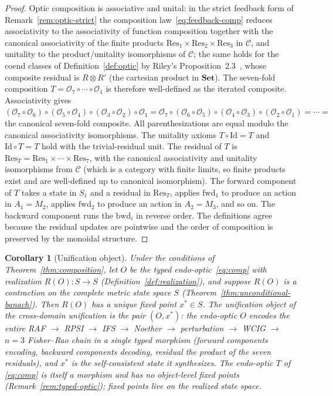 \documentclass[11pt,a4paper]{article}
\theoremstyle{plain}
\newtheorem{corollary}[theorem]{Corollary}
\theoremstyle{definition}
\theoremstyle{remark}
\newcommand{\OO}{\mathcal{O}}
\newcommand{\CC}{\mathcal{C}}
\begin{document}
\begin{proof}[Proof]
Optic composition is associative and unital: in the strict feedback
form of Remark~\ref{rem:optic-strict} the composition
law~\eqref{eq:feedback-comp} reduces associativity to the
associativity of function composition together with the canonical
associativity of the finite products
$\mathrm{Res}_1 \times \mathrm{Res}_2 \times \mathrm{Res}_3$ in
$\CC$, and unitality to the product/unitality isomorphisms of
$\CC$; the same holds for the coend classes of
Definition~\ref{def:optic} by Riley's
Proposition~2.3~\cite{riley2018optics}, whose composite residual is
$R \otimes R'$ (the cartesian product in $\mathbf{Set}$).
The seven-fold composition $T=\OO_7\circ\cdots\circ\OO_1$ is therefore
well-defined as the iterated composite. Associativity gives
$(\OO_7\circ\OO_6)\circ(\OO_5\circ\OO_4)\circ(\OO_3\circ\OO_2)\circ\OO_1
= \OO_7\circ(\OO_6\circ\OO_5)\circ(\OO_4\circ\OO_3)\circ(\OO_2\circ\OO_1)
= \cdots = $ the canonical seven-fold composite. All parenthesizations
are equal modulo the canonical associativity isomorphisms. The
unitality axioms $T\circ\mathrm{Id}=T$ and $\mathrm{Id}\circ T=T$
hold with the trivial-residual unit. The residual of $T$ is
$\mathrm{Res}_T=\mathrm{Res}_1\times\cdots\times\mathrm{Res}_7$, with
the canonical associativity and unitality isomorphisms from $\CC$
(which is a category with finite limits, so finite products exist and
are well-defined up to canonical isomorphism). The forward component of $T$ takes a state in
$S_1$ and a residual in $\mathrm{Res}_T$, applies $\mathrm{fwd}_1$ to
produce an action in $A_1 = M_2$, applies $\mathrm{fwd}_2$ to produce
an action in $A_2 = M_3$, and so on. The backward component runs the
$\mathrm{bwd}_i$ in reverse order. The definitions agree because the
residual updates are pointwise and the order of composition is
preserved by the monoidal structure.
\end{proof}

\begin{corollary}[Unification object]\label{cor:unification}
Under the conditions of Theorem~\ref{thm:composition}, let $O$ be the
typed endo-optic~\eqref{eq:comp} with realization $R(O) : S \to S$
(Definition~\ref{def:realization}), and suppose $R(O)$ is a
contraction on the complete metric state space $S$
(Theorem~\ref{thm:unconditional-banach}). Then $R(O)$ has a unique
fixed point $x^{*} \in S$. The \emph{unification object} of the
cross-domain unification is the pair $(O, x^{*})$: the endo-optic $O$
encodes the entire RAF $\to$ RPSI $\to$ IFS $\to$ Noether $\to$
perturbation $\to$ WCIG $\to$ $n=3$ Fisher--Rao chain in a single
typed morphism (forward components encoding, backward components
decoding, residual the product of the seven residuals), and $x^{*}$
is the self-consistent state it synthesizes. The endo-optic $T$ of
\eqref{eq:comp} is itself a morphism and has no object-level fixed
points (Remark~\ref{rem:typed-optic}); fixed points live on the
realized state space.
\end{corollary}
\end{document}
